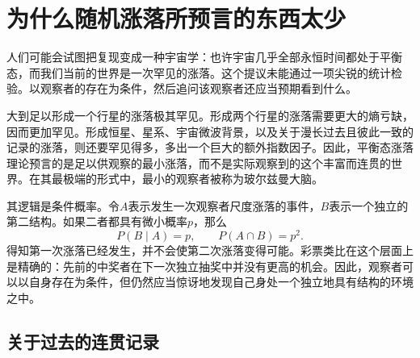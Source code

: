 \begin{classroomqa}
\end{classroomqa}

\section{为什么随机涨落所预言的东西太少}

人们可能会试图把复现变成一种宇宙学：也许宇宙几乎全部永恒时间都处于平衡态，而我们当前的世界是一次罕见的涨落。这个提议未能通过一项尖锐的统计检验。以观察者的存在为条件，然后追问该观察者还应当预期看到什么。

大到足以形成一个行星的涨落极其罕见。形成两个行星的涨落需要更大的熵亏缺，因而更加罕见。形成恒星、星系、宇宙微波背景，以及关于漫长过去且彼此一致的记录的涨落，则还要罕见得多，多出一个巨大的额外指数因子。因此，平衡态涨落理论预言的是足以供观察的最小涨落，而不是实际观察到的这个丰富而连贯的世界。在其最极端的形式中，最小的观察者被称为玻尔兹曼大脑。

其逻辑是条件概率。令\(A\)表示发生一次观察者尺度涨落的事件，\(B\)表示一个独立的第二结构。如果二者都具有微小概率\(p\)，那么
\begin{equation}
 P(B\mid A)=p,
 \qquad
 P(A\cap B)=p^2.
 \label{eq:sm8-conditional-fluctuations}
\end{equation}
得知第一次涨落已经发生，并不会使第二次涨落变得可能。彩票类比在这个层面上是精确的：先前的中奖者在下一次独立抽奖中并没有更高的机会。因此，观察者可以以自身存在为条件，但仍然应当惊讶地发现自己身处一个独立地具有结构的环境之中。

\begin{classroomqa}
\end{classroomqa}

\subsection{关于过去的连贯记录}

